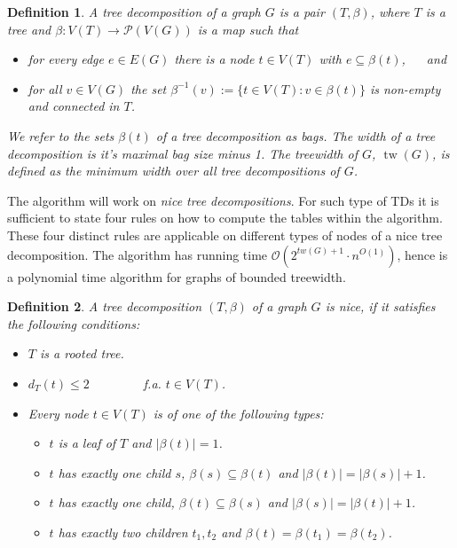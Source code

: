 \documentclass[11pt,a4paper]{article}
\newtheorem*{definition}{Definition}
\DeclareMathOperator{\tw}{tw}
\begin{document}
\begin{definition}
A \emph{tree decomposition} of a graph $G$ is a pair $(T, \beta)$, where $T$ is a tree and $\beta: V(T) \rightarrow \mathcal{P}(V(G))$ is a map such that
\begin{itemize}
\setlength{\itemindent}{.2in}
\item [(T1)] for every edge $e \in E(G)$ there is a node $t \in V(T)$ with $e \subseteq \beta(t)$, $\quad$ and 
\item [(T2)] for all $v \in V(G)$ the set $\beta^{-1}(v) := \{t \in V(T) : v \in \beta(t)\}$ is non-empty and connected in $T$.
\end{itemize}

We refer to the sets $\beta(t)$ of a tree decomposition as \emph{bags}. The width of a tree decomposition is it's maximal bag size minus 1. The \emph{treewidth} of $G$, $\tw(G)$, is defined as the minimum width over all tree decompositions of $G$. \\
\end{definition}

The algorithm will work on \emph{nice tree decompositions}. For such type of TDs it is sufficient to state four rules on how to compute the tables within the algorithm. These four distinct rules are applicable on different types of nodes of a nice tree decomposition. The algorithm has running time $\mathcal{O}(2^{tw(G)+1} \cdot n^{O(1)})$, hence is a polynomial time algorithm for graphs of bounded treewidth. \\ 

\begin{definition}
A tree decomposition $(T, \beta)$ of a graph $G$ is \emph{nice}, if it satisfies the following conditions: 

\begin{itemize}
\item $T$ is a rooted tree.
\item $d_{T}(t) \leq 2 \qquad \qquad$ f.a. $t \in V(T)$.
\item Every node $t \in V(T)$ is of one of the following types:
\begin{itemize}
\item [\textbf{leaf}] $t$ is a leaf of $T$ and $|\beta(t)| = 1$.
\item [\textbf{introduce}] $t$ has exactly one child $s$, $\beta(s) \subseteq \beta(t)$ and $|\beta(t)| = |\beta(s)| + 1$.
\item [\textbf{forget}] $t$ has exactly one child, $\beta(t) \subseteq \beta(s)$ and $|\beta(s)| = |\beta(t)| + 1$.
\item [\textbf{join}] $t$ has exactly two children $t_{1}, t_{2}$ and $\beta(t) = \beta(t_{1}) = \beta(t_{2})$.
\end{itemize}
\end{itemize}
 
\end{definition}
\end{document}
